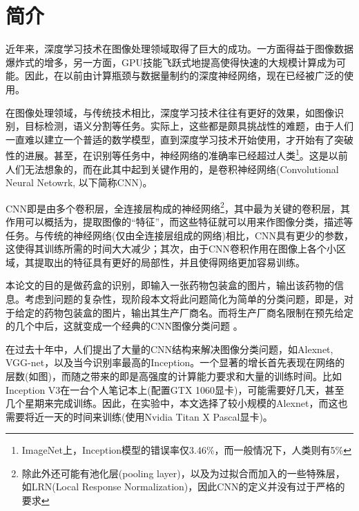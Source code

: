 \chapter{简介}


近年来，深度学习技术在图像处理领域取得了巨大的成功。一方面得益于图像数据爆炸式的增多，另一方面，GPU技能飞跃式地提高使得快速的大规模计算成为可能。因此，在以前由计算瓶颈与数据量制约的深度神经网络，现在已经被广泛的使用。

在图像处理领域，与传统技术相比，深度学习技术往往有更好的效果，如图像识别，目标检测，语义分割等任务。实际上，这些都是颇具挑战性的难题，由于人们一直难以建立一个普适的数学模型，直到深度学习技术开始使用，才开始有了突破性的进展。甚至，在识别等任务中，神经网络的准确率已经超过人类\footnote{ImageNet上，Inception模型的错误率仅3.46\%，而一般情况下，人类则有5\%}。这是以前人们无法想象的，而在此其中起到关键作用的，是卷积神经网络(Convolutional Neural Netowrk, 以下简称CNN)。

CNN即是由多个卷积层，全连接层构成的神经网络\footnote{除此外还可能有池化层(pooling layer)，以及为过拟合而加入的一些特殊层，如LRN(Local Response Normalization)，因此CNN的定义并没有过于严格的要求}，其中最为关键的卷积层，其作用可以概括为，提取图像的“特征”，而这些特征就可以用来作图像分类，描述等任务。与传统的神经网络(仅由全连接层组成的网络)相比，CNN具有更少的参数，这使得其训练所需的时间大大减少；其次，由于CNN卷积作用在图像上各个小区域，其提取出的特征具有更好的局部性，并且使得网络更加容易训练。

本论文的目的是做药盒的识别，即输入一张药物包装盒的图片，输出该药物的信息。考虑到问题的复杂性，现阶段本文将此问题简化为简单的分类问题，即是，对于给定的药物包装盒的图片，输出其生产厂商名。而将生产厂商名限制在预先给定的几个中后，这就变成一个经典的CNN图像分类问题 。

在过去十年中，人们提出了大量的CNN结构来解决图像分类问题，如Alexnet, VGG-net，以及当今识别率最高的Inception。一个显著的增长首先表现在网络的层数(如图)，而随之带来的即是高强度的计算能力要求和大量的训练时间。比如Inception V3在一台个人笔记本上(配置GTX 1060显卡)，可能需要好几天，甚至几个星期来完成训练。因此，在实验中，本文选择了较小规模的Alexnet，而这也需要将近一天的时间来训练(使用Nvidia Titan X Pascal显卡)。